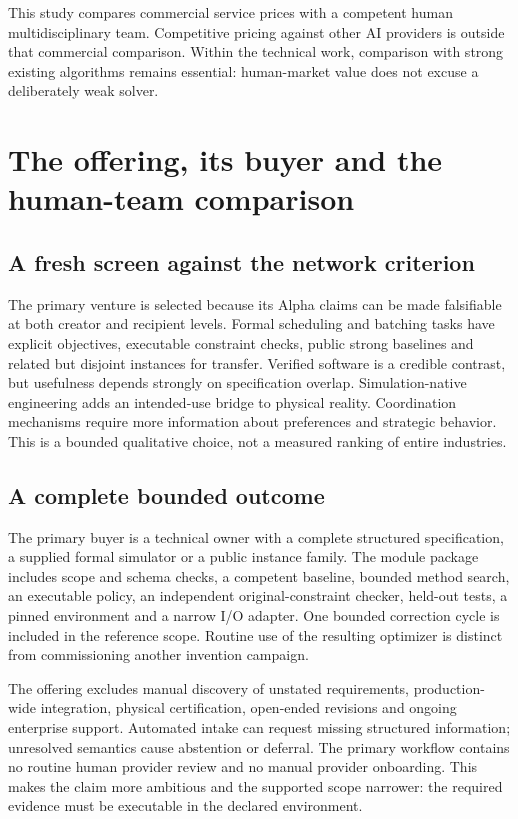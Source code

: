 \documentclass[11pt,a4paper]{article}
\begin{document}
This study compares commercial service prices with a competent human multidisciplinary team. Competitive pricing against other AI providers is outside that commercial comparison. Within the technical work, comparison with strong existing algorithms remains essential: human-market value does not excuse a deliberately weak solver.

\section{The offering, its buyer and the human-team comparison}

\subsection{A fresh screen against the network criterion}

The primary venture is selected because its Alpha claims can be made falsifiable at both creator and recipient levels. Formal scheduling and batching tasks have explicit objectives, executable constraint checks, public strong baselines and related but disjoint instances for transfer. Verified software is a credible contrast, but usefulness depends strongly on specification overlap. Simulation-native engineering adds an intended-use bridge to physical reality. Coordination mechanisms require more information about preferences and strategic behavior. This is a bounded qualitative choice, not a measured ranking of entire industries.

\subsection{A complete bounded outcome}

The primary buyer is a technical owner with a complete structured specification, a supplied formal simulator or a public instance family. The module package includes scope and schema checks, a competent baseline, bounded method search, an executable policy, an independent original-constraint checker, held-out tests, a pinned environment and a narrow I/O adapter. One bounded correction cycle is included in the reference scope. Routine use of the resulting optimizer is distinct from commissioning another invention campaign.

The offering excludes manual discovery of unstated requirements, production-wide integration, physical certification, open-ended revisions and ongoing enterprise support. Automated intake can request missing structured information; unresolved semantics cause abstention or deferral. The primary workflow contains no routine human provider review and no manual provider onboarding. This makes the claim more ambitious and the supported scope narrower: the required evidence must be executable in the declared environment.
\end{document}
